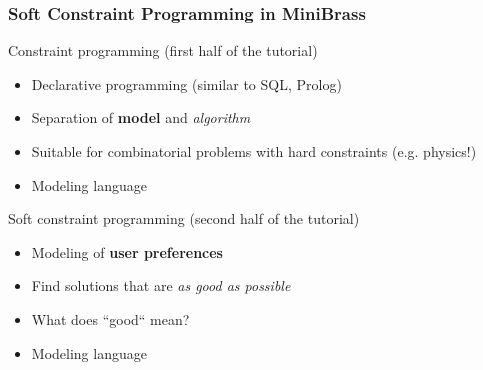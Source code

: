 \begin{frame}
    \frametitle{Soft Constraint Programming in MiniBrass}
 \alert{Constraint programming} (first half of the tutorial)
    \begin{itemize}
    \item Declarative programming (similar to SQL, Prolog)
    \item Separation of \textbf{model} and \emph{algorithm}
    \item Suitable for combinatorial problems with hard constraints (e.g. physics!)
    \item Modeling language 
    \end{itemize}

    \vspace*{3ex}
    
\alert{Soft constraint programming} (second half of the tutorial)
    \begin{itemize} 
    \item Modeling of \textbf{user preferences}
    \item Find solutions that are \emph{as good as possible} 
    \item What does ``good`` mean?
    \item Modeling language 
     \end{itemize}
\end{frame}

